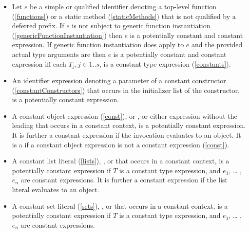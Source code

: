 \documentclass[makeidx]{article}
\begin{document}
{\begin{itemize}
{    the expression  is a constant,
    and if $C$ is imported with a prefix $p$,  is
    a constant  instance representing the type of $C$
    unless $p$ is a deferred prefix.%
  }
\item
  Let $e$ be a simple or qualified identifier denoting
  a top-level function (\ref{functions})
  or a static method (\ref{staticMethods})
  that is not qualified by a deferred prefix.
  If $e$ is not subject to generic function instantiation
  (\ref{genericFunctionInstantiation})
  then $e$ is a potentially constant and constant expression.
  If generic function instantiation does apply to $e$
  and the provided actual type arguments are 
  then $e$ is a potentially constant and constant expression
  if{}f each $T_j, j \in 1 .. s$, is a constant type expression
  (\ref{constants}).
\item
  An identifier expression denoting a parameter of a constant constructor
  (\ref{constantConstructors})
  that occurs in the initializer list of the constructor,
  is a potentially constant expression.
\item
  A constant object expression (\ref{const}),
   or
  ,
  or either expression without the leading \CONST{} that occurs in
  a constant context,
  is a potentially constant expression.
  It is further a constant expression if the invocation evaluates to an object.
  It is a  if a constant object expression is
  not a constant expression (\ref{const}).
\item
  A constant list literal (\ref{lists}),
  , or
  that occurs in a constant context,
  is a potentially constant expression if $T$ is a constant type expression,
  and $e_1$, \ldots{} , $e_n$ are constant expressions.
  It is further a constant expression
  if the list literal evaluates to an object.
\item
  A constant set literal (\ref{sets}),
  , or
  that occurs in a constant context,
  is a potentially constant expression
  if $T$ is a constant type expression,
  and $e_1$, \ldots{} , $e_n$ are constant expressions.

\end{itemize}}
\end{document}

